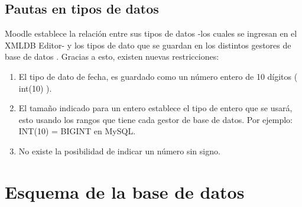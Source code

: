 \subsection{Pautas en tipos de datos}
        
         Moodle establece la relación entre sus tipos de datos -los cuales se ingresan en el XMLDB Editor- y los tipos de dato que se guardan en los distintos gestores de base de datos \cite{moodleTiposBD}.  Gracias a esto, existen nuevas restricciones:
        \begin{enumerate}
            \item El tipo de dato de fecha, es guardado como un número entero de 10 dígitos ( int(10) ).
            \item El tamaño indicado para un entero establece el tipo de entero que se usará, esto usando los rangos que tiene cada gestor de base de datos. Por ejemplo: INT(10) = BIGINT en MySQL.
            \item No existe la posibilidad de indicar un número sin signo.
        \end{enumerate}
        
\clearpage        
\section{Esquema de la base de datos}
    
    

\clearpage

